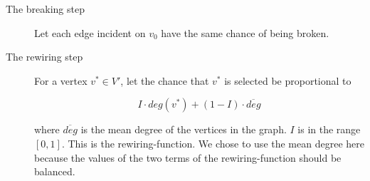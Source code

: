 \documentclass[a4paper,10pt]{article}
\begin{document}
\begin{description}
 \item[The breaking step] Let each edge incident on $v_0$ have the same chance of being broken.

 \item[The rewiring step] For a vertex $v^* \in V'$, let the chance that $v^*$ is selected be proportional to

 \begin{equation}
\label{eqn:rewiring-function}
  I \cdot deg(v^*) + (1 - I) \cdot \overline{deg}
 \end{equation}

where $\overline{deg}$ is the mean degree of the vertices in the graph. $I$ is in the range $[0, 1]$. This is the rewiring-function. We chose to use the mean degree here because the values of the two terms of the rewiring-function should be balanced. 

\end{description}
\end{document}
